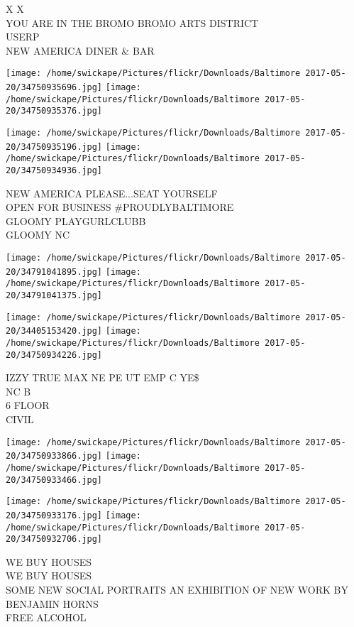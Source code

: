 \documentclass[10pt,letterpaper]{article}
\begin{document}
X X\\
YOU ARE IN THE BROMO BROMO ARTS DISTRICT\\
USERP\\
NEW AMERICA DINER \& BAR
\pagebreak

\texttt{[image: /home/swickape/Pictures/flickr/Downloads/Baltimore 2017-05-20/34750935696.jpg]}
\texttt{[image: /home/swickape/Pictures/flickr/Downloads/Baltimore 2017-05-20/34750935376.jpg]}

\texttt{[image: /home/swickape/Pictures/flickr/Downloads/Baltimore 2017-05-20/34750935196.jpg]}
\texttt{[image: /home/swickape/Pictures/flickr/Downloads/Baltimore 2017-05-20/34750934936.jpg]}

NEW AMERICA PLEASE...SEAT YOURSELF\\
OPEN FOR BUSINESS \#PROUDLYBALTIMORE\\
GLOOMY PLAYGURLCLUBB\\
GLOOMY NC
\pagebreak

\texttt{[image: /home/swickape/Pictures/flickr/Downloads/Baltimore 2017-05-20/34791041895.jpg]}
\texttt{[image: /home/swickape/Pictures/flickr/Downloads/Baltimore 2017-05-20/34791041375.jpg]}

\texttt{[image: /home/swickape/Pictures/flickr/Downloads/Baltimore 2017-05-20/34405153420.jpg]}
\texttt{[image: /home/swickape/Pictures/flickr/Downloads/Baltimore 2017-05-20/34750934226.jpg]}

IZZY TRUE MAX NE PE UT EMP C YE\$\\
NC B\\
6 FLOOR\\
CIVIL
\pagebreak

\texttt{[image: /home/swickape/Pictures/flickr/Downloads/Baltimore 2017-05-20/34750933866.jpg]}
\texttt{[image: /home/swickape/Pictures/flickr/Downloads/Baltimore 2017-05-20/34750933466.jpg]}

\texttt{[image: /home/swickape/Pictures/flickr/Downloads/Baltimore 2017-05-20/34750933176.jpg]}
\texttt{[image: /home/swickape/Pictures/flickr/Downloads/Baltimore 2017-05-20/34750932706.jpg]}

WE BUY HOUSES\\
WE BUY HOUSES\\
SOME NEW SOCIAL PORTRAITS AN EXHIBITION OF NEW WORK BY BENJAMIN HORNS\\
FREE ALCOHOL
\pagebreak
\end{document}
